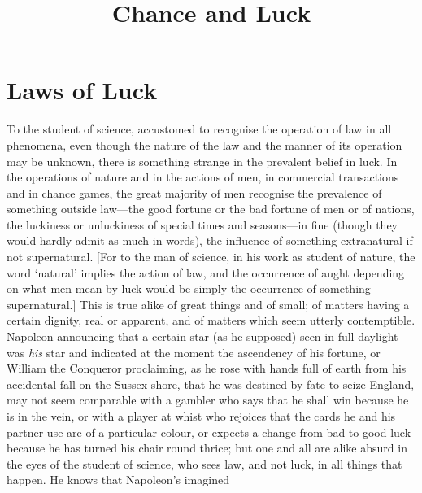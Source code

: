 \documentclass[letterpaper,12pt,oneside,openany]{memoir}
\begin{document}
\setpnumwidth{2.75em}
\setcounter{secnumdepth}{-1}
\setcounter{tocdepth}{1}
\tableofcontents*
\clearpage

%
%
%
%
%
%
%
%
%

\pagestyle{headings}
\title{Chance and Luck}
\thispagestyle{chapter}
\chapter{Laws of Luck}

To the student of science, accustomed to recognise the
operation of law in all phenomena, even though the
nature of the law and the manner of its operation may
be unknown, there is something strange in the prevalent
belief in luck. In the operations of nature and in the
actions of men, in commercial transactions and in
chance games, the great majority of men recognise the
prevalence of something outside law---the good fortune
or the bad fortune of men or of nations, the luckiness
or unluckiness of special times and seasons---in fine
(though they would hardly admit as much in words),
the influence of something extranatural if not supernatural.
[For to the man of science, in his work as
student of nature, the word `natural' implies the action
of law, and the occurrence of aught depending on what
men mean by luck would be simply the occurrence of
something supernatural.] This is true alike of great
things and of small; of matters having a certain dignity,
real or apparent, and of matters which seem utterly contemptible.
Napoleon announcing that a certain star
(as he supposed) seen in full daylight was \textit{his} star and
indicated at the moment the ascendency of his fortune,
or William the Conqueror proclaiming, as he rose with
hands full of earth from his accidental fall on the Sussex
shore, that he was destined by fate to seize England,
may not seem comparable with a gambler who says that
he shall win because he is in the vein, or with a player
at whist who rejoices that the cards he and his partner
use are of a particular colour, or expects a change from
bad to good luck because he has turned his chair round
thrice; but one and all are alike absurd in the eyes of
the student of science, who sees law, and not luck, in all
things that happen. He knows that Napoleon's imagined
\end{document}
